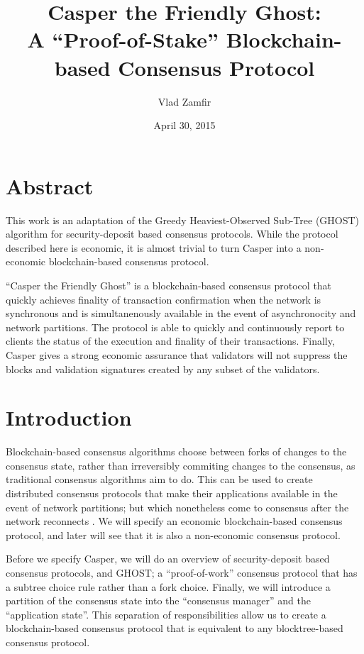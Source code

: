 \documentclass[11pt,a4paper]{article}
\title{Casper the Friendly Ghost: \\
		\vspace{2.5mm}
		\small A ``Proof-of-Stake'' Blockchain-based Consensus Protocol}
\date{April 30, 2015}
\author{Vlad Zamfir}
\begin{document}
\maketitle%

\tableofcontents

\pagebreak

\section{Abstract}

This work is an adaptation of the Greedy Heaviest-Observed Sub-Tree\cite{GHOST} (GHOST) algorithm for security-deposit based consensus protocols. While the protocol described here is economic, it is almost trivial to turn Casper into a non-economic blockchain-based consensus protocol. 

``Casper the Friendly Ghost'' is a blockchain-based consensus protocol that quickly achieves finality of transaction confirmation when the network is synchronous and is simultanenously available in the event of asynchronocity and network partitions. The protocol is able to quickly and continuously report to clients the status of the execution and finality of their transactions. Finally, Casper gives a strong economic assurance that validators will not suppress the blocks and validation signatures created by any subset of the validators.


\section{Introduction}

Blockchain-based consensus algorithms choose between forks of changes to the consensus state, rather than irreversibly commiting changes to the consensus, as traditional consensus algorithms aim to do. This can be used to create distributed consensus protocols that make their applications available in the event of network partitions; but which nonetheless come to consensus after the network reconnects \cite{ReformalizingConsensus}. We will specify an economic blockchain-based consensus protocol, and later will see that it is also a non-economic consensus protocol.

Before we specify Casper, we will do an overview of security-deposit based consensus protocols, and GHOST; a ``proof-of-work'' consensus protocol that has a subtree choice rule rather than a fork choice. Finally, we will introduce a partition of the consensus state into the ``consensus manager'' and the ``application state''. This separation of responsibilities allow us to create a blockchain-based consensus protocol that is equivalent to any blocktree-based consensus protocol.
\end{document}
